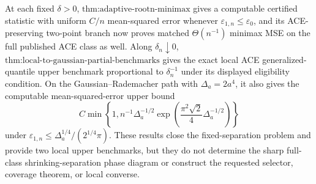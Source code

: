 At each fixed \(\delta>0\), \(\text{thm:adaptive-rootn-minimax}\) gives a computable certified statistic with uniform \(C/n\) mean-squared error whenever \(\varepsilon_{1,n}\le\varepsilon_0\), and its ACE-preserving two-point branch now proves matched \(\Theta(n^{-1})\) minimax MSE on the full published ACE class as well. Along \(\delta_n\downarrow0\), \(\text{thm:local-to-gaussian-partial-benchmarks}\) gives the exact local ACE generalized-quantile upper benchmark proportional to \(\delta_n^{-1}\) under its displayed eligibility condition. On the Gaussian--Rademacher path with \(\Delta_a=2a^4\), it also gives the computable mean-squared-error upper bound
\[
 C\min\!\left\{1,n^{-1}\Delta_a^{-1/2}
 \exp\!\left(\frac{\pi^2\sqrt2}{4}\Delta_a^{-1/2}\right)\right\}
\]
under \(\varepsilon_{1,n}\le\Delta_a^{1/4}/(2^{1/4}\pi)\). These results close the fixed-separation problem and provide two local upper benchmarks, but they do not determine the sharp full-class shrinking-separation phase diagram or construct the requested selector, coverage theorem, or local converse.